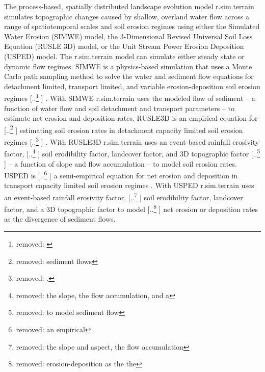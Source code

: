 \documentclass[gmd, manuscript]{copernicus}
\providecommand{\DIFadd}[1]{{\protect\color{blue} \sf #1}} %
\providecommand{\DIFdel}[1]{{\protect\color{red} [..\footnote{removed: #1} ]}} %
\providecommand{\DIFaddbegin}{} %
\providecommand{\DIFaddend}{} %
\providecommand{\DIFdelbegin}{} %
\providecommand{\DIFdelend}{} %
\begin{document}
\DIFaddend The process-based, spatially distributed 
landscape evolution model r.sim.terrain
simulates topographic changes
caused by shallow, overland water flow
across a range of spatiotemporal scales and soil erosion regimes
using either
the Simulated Water Erosion (SIMWE) model, 
the 3-Dimensional Revised Universal Soil Loss Equation (RUSLE 3D) model,
or the Unit Stream Power Erosion Deposition (USPED) model.  
\DIFaddbegin \DIFadd{The r.sim.terrain model
can simulate either steady state or dynamic flow regimes.
}\DIFaddend %
SIMWE is a physics-based simulation
that uses a Monte Carlo path sampling method
to solve the water and sediment flow equations
for detachment limited, transport limited, and variable erosion-deposition 
soil erosion regimes 
\DIFdelbegin \DIFdel{\citep{Mitasova2004}}\DIFdelend \DIFaddbegin \DIFadd{\citep{Mitas1998,Mitasova2004}}\DIFaddend . 
With SIMWE 
r.sim.terrain
uses the modeled flow of sediment 
-- a function of water flow and soil detachment and transport parameters -- 
to estimate net erosion and deposition rates. 
RUSLE3D is an empirical equation for \DIFdelbegin \DIFdel{sediment flows 
}\DIFdelend \DIFaddbegin \DIFadd{estimating soil erosion rates
}\DIFaddend in detachment capacity limited soil erosion regimes 
\DIFdelbegin \DIFdel{\citep{Mitasova1996}. 
}\DIFdelend \DIFaddbegin \DIFadd{\citep{Mitasova1996,Mitasova2013}. 
}\DIFaddend With RUSLE3D r.sim.terrain
uses an event-based \DIFaddbegin \DIFadd{rainfall }\DIFaddend erosivity factor, 
\DIFdelbegin \DIFdel{the slope, the flow accumulation, and a }\DIFdelend \DIFaddbegin \DIFadd{soil erodibility factor, landcover factor, and }\DIFaddend 3D topographic factor
\DIFdelbegin \DIFdel{to model sediment flow}\DIFdelend \DIFaddbegin \DIFadd{-- a function of slope and flow accumulation --
to model soil erosion rates}\DIFaddend . 
USPED is \DIFdelbegin \DIFdel{an empirical }\DIFdelend \DIFaddbegin \DIFadd{a semi-empirical }\DIFaddend equation for net erosion and deposition 
in transport capacity limited soil erosion regimes 
\DIFaddbegin \DIFadd{\citep{Mitasova1996,Mitasova2013}}\DIFaddend . 
With USPED r.sim.terrain uses an event-based \DIFaddbegin \DIFadd{rainfall }\DIFaddend erosivity factor, 
\DIFdelbegin \DIFdel{the slope and aspect, the flow accumulation}\DIFdelend \DIFaddbegin \DIFadd{soil erodibility factor, landcover factor}\DIFaddend , and a 3D topographic factor
to model \DIFdelbegin \DIFdel{erosion-deposition as the the }\DIFdelend \DIFaddbegin \DIFadd{net erosion or deposition rates as the }\DIFaddend divergence of sediment flows. 
\end{document}
